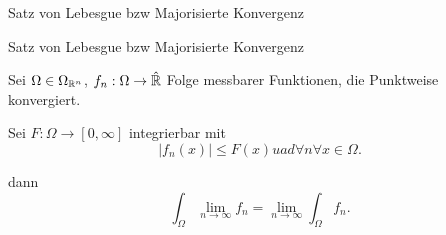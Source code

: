 \documentclass[class=article, crop=false]{standalone}
\begin{document}
\begin{zettel}{Satz von Lebesgue bzw Majorisierte Konvergenz}

\begin{flashcard}[12t359wt]{Satz von Lebesgue bzw Majorisierte Konvergenz}
	\begin{theorem}
		Sei $\Omega \in  \Omega_{\mathbb{R}^n}$, $f_n: \Omega \to  \hat{\mathbb{R}  }$ Folge messbarer Funktionen, die Punktweise konvergiert.

		Sei $F: \Omega \to [0,\infty]$ integrierbar mit
		\[
			|f_n(x) | \leq  F(x)uad \forall n \forall x \in \Omega
		.\]

		dann
		\[
			\int_{\Omega} \lim_{n \to  \infty} f_n =  \lim_{n \to  \infty} \int_{\Omega}  f_n
		.\]
	\end{theorem}
\end{flashcard}

\end{zettel}
\end{document}
